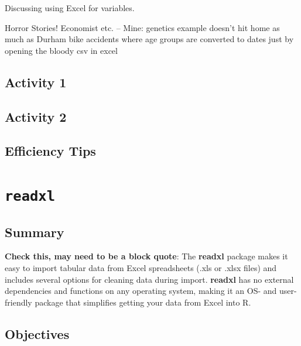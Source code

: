 \documentclass[]{book}
\begin{document}
Discussing using Excel for variables.

Horror Stories! Economist etc. -- Mine: genetics example doesn't hit home as much as Durham bike accidents where age groups are converted to dates just by opening the bloody csv in excel

\hypertarget{activity-1}{%
\section{Activity 1}\label{activity-1}}

\hypertarget{activity-2}{%
\section{Activity 2}\label{activity-2}}

\hypertarget{efficiency-tips}{%
\section{Efficiency Tips}\label{efficiency-tips}}

\hypertarget{readxl}{%
\chapter{\texorpdfstring{\texttt{readxl}}{readxl}}\label{readxl}}

\hypertarget{summary}{%
\section{Summary}\label{summary}}

\textbf{Check this, may need to be a block quote}: The \textbf{readxl} package makes it easy to import tabular data from Excel spreadsheets (.xls or .xlsx files) and includes several options for cleaning data during import. \textbf{readxl} has no external dependencies and functions on any operating system, making it an OS- and user-friendly package that simplifies getting your data from Excel into R.

\hypertarget{objectives}{%
\section{Objectives}\label{objectives}}
\end{document}
